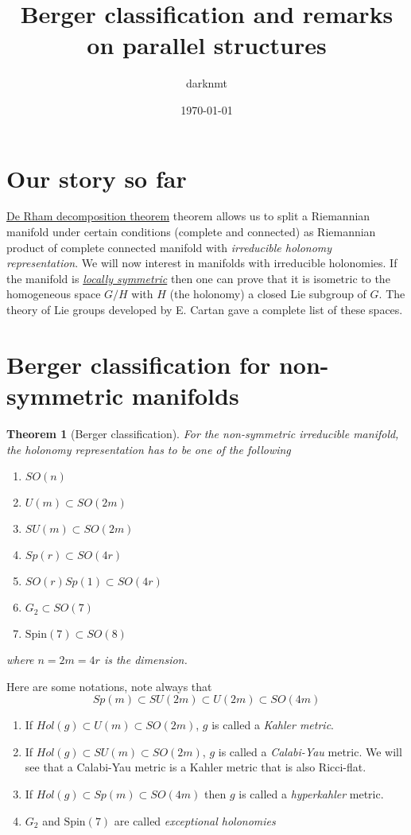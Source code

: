 \documentclass[11pt]{article}
\author{darknmt}
\date{\today}
\title{Berger classification and remarks on parallel structures}
\newtheorem{theorem}{Theorem}
\begin{document}
\maketitle
\tableofcontents


\section*{Our story so far}
\label{sec:org9b9b79f}

\href{./de-rham-decomposition.org}{De Rham decomposition theorem} theorem allows us to split a Riemannian manifold under certain
conditions (complete and connected) as Riemannian product of complete connected manifold with
\emph{irreducible holonomy representation}. We will now interest in manifolds with irreducible
holonomies. If the manifold is \href{./symmetric-space.org}{\emph{locally symmetric}} then one can prove that it is isometric to the
homogeneous space \(G/H\) with \(H\) (the holonomy) a closed Lie subgroup of \(G\). The theory of Lie
groups developed by E. Cartan gave a complete list of these spaces.


\section*{Berger classification for non-symmetric manifolds}
\label{sec:org432de84}

\begin{theorem}[Berger classification]
\label{thm:Berger}
\label{org58294f1}
For the non-symmetric irreducible manifold, the holonomy representation has to be one of the
following
\begin{enumerate}
\item \(SO(n)\)
\item \(U(m)\subset SO(2m)\)
\item \(SU(m)\subset SO(2m)\)
\item \(Sp(r) \subset SO(4r)\)
\item \(SO(r)Sp(1) \subset SO(4r)\)
\item \(G_2\subset SO(7)\)
\item \(\text{Spin}(7)\subset SO(8)\)
\end{enumerate}
where \(n=2m=4r\) is the dimension.
\end{theorem}

Here are some notations, note always that
\[
Sp(m)\subset SU(2m)\subset U(2m)\subset SO(4m)
\]
\begin{enumerate}
\item If \(Hol(g)\subset U(m)\subset SO(2m)\), \(g\) is called a \emph{Kahler metric}.
\item If \(Hol(g)\subset SU(m)\subset SO(2m)\), \(g\) is called a \emph{Calabi-Yau} metric. We will see that a
Calabi-Yau metric is a Kahler metric that is also Ricci-flat.
\item If \(Hol(g)\subset Sp(m)\subset SO(4m)\) then \(g\) is called a \emph{hyperkahler} metric.
\item \(G_2\) and \(\text{Spin}(7)\) are called \emph{exceptional holonomies}
\end{enumerate}
\end{document}
